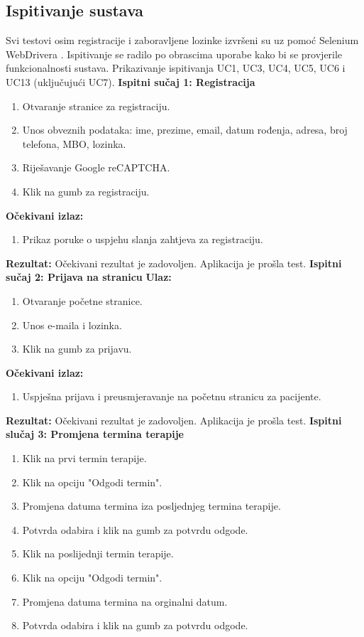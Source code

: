 			\subsection{Ispitivanje sustava}
			Svi testovi osim registracije i zaboravljene lozinke izvršeni su uz pomoć Selenium WebDrivera . Ispitivanje se radilo po obrascima uporabe kako bi
se provjerile funkcionalnosti sustava. Prikazivanje ispitivanja UC1, UC3, UC4, UC5, UC6 i UC13 (uključujući UC7).
			\newline
			\textbf{Ispitni sučaj 1: Registracija} 
			\begin{enumerate}
				\item Otvaranje stranice za registraciju.
				\item Unos obveznih podataka: ime, prezime, email, datum rođenja, adresa, broj telefona, MBO, lozinka.
				\item Riješavanje Google reCAPTCHA.
				\item Klik na gumb za registraciju.
			\end{enumerate}
			\textbf{Očekivani izlaz:}
			\begin{enumerate}
				\item Prikaz poruke o uspjehu slanja zahtjeva za registraciju.
			\end{enumerate}
			\textbf{Rezultat:} Očekivani rezultat je zadovoljen. \color{green} Aplikacija je prošla test. \color{black} \newline
			\textbf{Ispitni sučaj 2: Prijava na stranicu} 
			\textbf{Ulaz:}
			\begin{enumerate}
				\item Otvaranje početne stranice.
				\item Unos e-maila i lozinka.
				\item Klik na gumb za prijavu.
			\end{enumerate}
			\textbf{Očekivani izlaz:}
			\begin{enumerate}
				\item Uspješna prijava i preusmjeravanje na početnu stranicu za pacijente.
			\end{enumerate}
			\textbf{Rezultat:} Očekivani rezultat je zadovoljen. \color{green} Aplikacija je prošla test. \color{black} \newline
			\textbf{Ispitni slučaj 3: Promjena termina terapije}
			\begin{enumerate}
				\item Klik na prvi termin terapije.
				\item Klik na opciju "Odgodi termin".
				\item Promjena datuma termina iza posljednjeg termina terapije.
				\item Potvrda odabira i klik na gumb za potvrdu odgode.
				\item Klik na poslijednji termin terapije.
				\item Klik na opciju "Odgodi termin".
				\item Promjena datuma termina na orginalni datum.
				\item Potvrda odabira i klik na gumb za potvrdu odgode.
			\end{enumerate}
